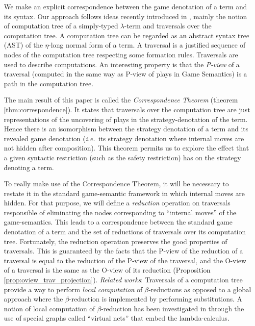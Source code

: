 
We make an explicit correspondence between the game denotation of a term and its syntax. Our approach follows ideas recently introduced in \cite{OngLics2006}, mainly the notion of computation tree of a simply-typed $\lambda$-term and traversals over the computation tree. A computation tree can be regarded as an abstract syntax tree (AST) of the $\eta$-long normal form of a term. A traversal is a justified sequence of nodes of the computation tree respecting some formation rules. Traversals are used to describe computations. An interesting property is that the \emph{P-view} of a traversal (computed in the same way as P-view of plays in Game Semantics) is a path in the computation tree.

The main result of this paper is called the \emph{Correspondence Theorem} (theorem \ref{thm:correspondence}). It states that traversals over the computation tree are just representations of the uncovering of plays in the strategy-denotation of the term. Hence there is an isomorphism between the strategy denotation of a term and its revealed game denotation ({\it i.e.}~its strategy denotation where internal moves are not hidden after composition). This theorem permits us to explore the effect that a given syntactic restriction (such as the safety restriction) has on the strategy denoting a term.

To really make use of the Correspondence Theorem, it will be necessary to restate it in the standard game-semantic framework in which internal moves are hidden. For that purpose, we will define a \emph{reduction} operation on traversals responsible of eliminating the nodes corresponding to ``internal moves'' of the game-semantics. This leads to a correspondence between the standard game denotation of a term and the set of reductions of traversals over its computation tree. Fortunately, the reduction operation preserves the good properties of traversals. This is guaranteed by the facts that the P-view of
the reduction of a traversal is equal to the reduction of the P-view of the traversal, and the O-view of a traversal is the same as the
O-view of its reduction (Proposition \ref{prop:oview_trav_projection}). \vspace{8pt} \emph{Related works}: Traversals of a computation tree provide a way to perform \emph{local computation} of $\beta$-reductions as opposed to a global approach where the $\beta$-reduction is implemented by
performing substitutions. A notion of local computation of $\beta$-reduction has been investigated in \cite{DanosRegnier-Localandasynchronou} through the use of special graphs called ``virtual nets'' that embed the lambda-calculus.

